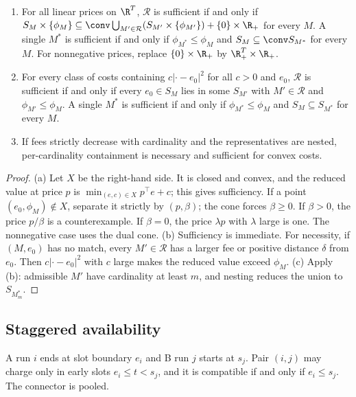 \begin{theorem}[Characterization]\label{ext:thm5}
\begin{enumerate}[label=(\alph*),itemsep=1pt]
\item For all linear prices on $\R^T$, $\mathcal R$ is sufficient if and only
if $S_M\times\{\phi_M\}\subseteq\conv\bigcup_{M'\in\mathcal R}(S_{M'}\times\{\phi_{M'}\})+\{0\}\times\R_+$
for every $M$. A single $M^*$ is sufficient if and only if
$\phi_{M^*}\le\phi_M$ and $S_M\subseteq\conv S_{M^*}$ for every $M$. For
nonnegative prices, replace $\{0\}\times\R_+$ by $\R^T_+\times\R_+$.
\item For every class of costs containing $c\lvert\cdot-e_0\rvert^2$ for all
$c>0$ and $e_0$, $\mathcal R$ is sufficient if and only if every $e_0\in S_M$
lies in some $S_{M'}$ with $M'\in\mathcal R$ and $\phi_{M'}\le\phi_M$. A single
$M^*$ is sufficient if and only if $\phi_{M^*}\le\phi_M$ and
$S_M\subseteq S_{M^*}$ for every $M$.
\item If fees strictly decrease with cardinality and the representatives are
nested, per-cardinality containment is necessary and sufficient for convex
costs.
\end{enumerate}
\end{theorem}
\begin{proof}
(a) Let $X$ be the right-hand side. It is closed and convex, and the reduced
value at price $p$ is $\min_{(e,c)\in X}p^\top e+c$; this gives sufficiency.
If a point $(e_0,\phi_M)\notin X$, separate it strictly by $(p,\beta)$; the
cone forces $\beta\ge0$. If $\beta>0$, the price $p/\beta$ is a
counterexample. If $\beta=0$, the price $\lambda p$ with $\lambda$ large is
one. The nonnegative case uses the dual cone.
(b) Sufficiency is immediate. For necessity, if $(M,e_0)$ has no match, every
$M'\in\mathcal R$ has a larger fee or positive distance $\delta$ from $e_0$.
Then $c\lvert\cdot-e_0\rvert^2$ with $c$ large makes the reduced value exceed
$\phi_M$.
(c) Apply (b): admissible $M'$ have cardinality at least $m$, and nesting
reduces the union to $S_{M^*_m}$.
\end{proof}

\subsection*{Staggered availability}

A run $i$ ends at slot boundary $e_i$ and B run $j$ starts at $s_j$. Pair
$(i,j)$ may charge only in early slots $e_i\le t<s_j$, and it is compatible if
and only if $e_i\le s_j$. The connector is pooled.

